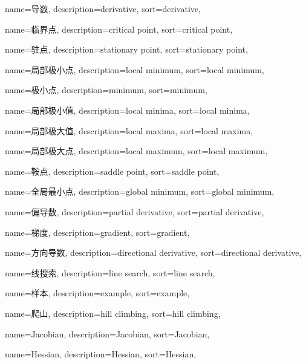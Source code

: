 {
  name=导数,
  description={derivative},
  sort={derivative},
}

{
  name=临界点,
  description={critical point},
  sort={critical point},
}

{
  name=驻点,
  description={stationary point},
  sort={stationary point},
}

{
  name=局部极小点,
  description={local minimum},
  sort={local minimum},
}

{
	name=极小点,
	description={minimum},
	sort={minimum},
}

{
  name=局部极小值,
  description={local minima},
  sort={local minima},
}

{
  name=局部极大值,
  description={local maxima},
  sort={local maxima},
}

{
  name=局部极大点,
  description={local maximum},
  sort={local maximum},
}

{
  name=鞍点,
  description={saddle point},
  sort={saddle point},
}

{
  name=全局最小点,
  description={global minimum},
  sort={global minimum},
}

{
  name=偏导数,
  description={partial derivative},
  sort={partial derivative},
}

{
  name=梯度,
  description={gradient},
  sort={gradient},
}

{
  name=方向导数,
  description={directional derivative},
  sort={directional derivative},
}

{
  name=线搜索,
  description={line search},
  sort={line search},
}

{
  name=样本,
  description={example},
  sort={example},
}

{
  name=爬山,
  description={hill climbing},
  sort={hill climbing},
}

{
  name=Jacobian,
  description={Jacobian},
  sort={Jacobian},
}

{
  name=Hessian,
  description={Hessian},
  sort={Hessian},
}

